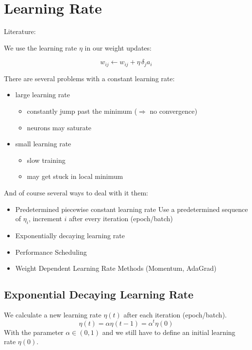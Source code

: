\section{Learning Rate}\label{sec:learning-rate}
Literature: \cite[Chapter 6.8]{Duda2000}

We use the learning rate $\eta$ in our weight updates:

\[w_{ij} \leftarrow w_{ij} + \eta\, \delta_j a_i\]

There are several problems with a constant learning rate:
\begin{itemize}
\item large learning rate
	\begin{itemize}
	\item constantly jump past the minimum ($\Rightarrow$ no convergence)
	\item neurons may saturate
	\end{itemize}
\item small learning rate
	\begin{itemize}
	\item slow training
	\item may get stuck in local minimum
	\end{itemize}
\end{itemize}

And of course several ways to deal with it them:
\begin{itemize}
\item Predetermined piecewise constant learning rate\newline
	Use a predetermined sequence of $\eta_i$, increment $i$ after every iteration (epoch/batch)
\item Exponentially decaying learning rate
\item Performance Scheduling
\item Weight Dependent Learning Rate Methods (\eg Momentum, AdaGrad)
\end{itemize}

\subsection{Exponential Decaying Learning Rate}
We calculate a new learning rate $\eta(t)$ after each iteration (epoch/batch).
\begin{equation}\label{eq:exponential-decaying-eta}
\eta(t)=\alpha\eta(t-1)=\alpha^t\eta(0)
\end{equation}
With the parameter $\alpha \in (0,1)$ and we still have to define an initial learning rate $\eta(0)$.

